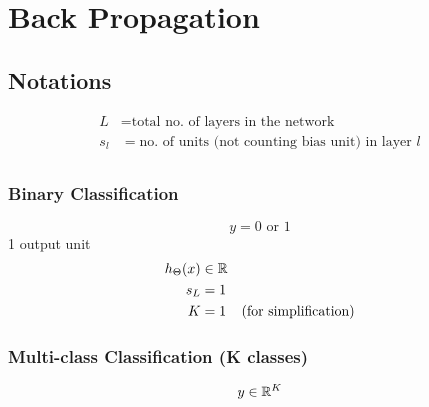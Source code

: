\chapter{Back Propagation}

\section{Notations}
\begin{align*}
	L   & = \text{total no. of layers in the network}                \\
	s_l & = \text{no. of units (not counting bias unit) in layer } l \\
\end{align*}

\subsection*{Binary Classification}
\begin{equation*}
	y = 0 \text{ or } 1
\end{equation*}
1 output unit
\begin{align*}
	h_\Theta(x) & \in \mathbb{R}                               \\
	s_L         & = 1                                  \\
	K           & = 1    & \text{(for simplification)} \\
\end{align*}

\subsection*{Multi-class Classification (K classes)}
\begin{equation*}
	y \in \mathbb{R}^K
\end{equation*}
